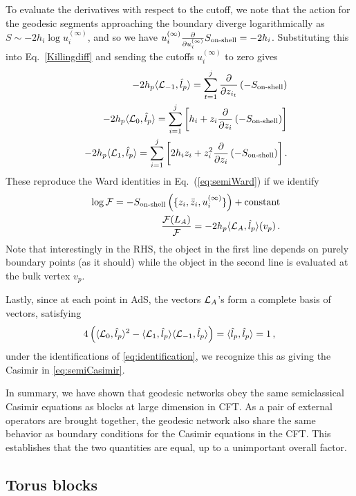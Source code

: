 \documentclass[12pt]{article}
\newcommand{\bea}{\begin{eqnarray}}
\newcommand{\eea}{\end{eqnarray}}
\begin{document}
To evaluate the derivatives with respect to the cutoff, we note that the action for the geodesic segments approaching the boundary diverge logarithmically as $S \sim -2h_i \log u_i^{(\infty)}$, and so we have $\scriptsize{u_{i}^{(\infty)}}\frac{\partial}{\partial u_{i}^{(\infty)}}S_{\text{on-shell}}= -2h_i$. Substituting this into Eq.~\ref{Killingdiff} and sending the cutoffs $u_{i}^{(\infty)}$ to zero gives
\bea
 &~&-2h_p\langle {\cal{L}}_{-1},\hat{l}_p\rangle=\sum_{t=1}^{j}\frac{\partial}{\partial z_{i_t}}\left(-S_{\text{on-shell}}\right) \notag \\
&~&-2h_p\langle{\cal{L}}_0,\hat{l}_p\rangle=\sum_{i=1}^{j}\left[
h_{i}
+z_{i}\frac{\partial}{\partial z_{i}}\left(-S_{\text{on-shell}}\right)\right] \notag \\
&~&
-2h_p \langle {\cal{L}}_1,\hat{l}_p\rangle=\sum_{i=1}^{j}
\left[
2h_{i}z_{i}
+
z_{i}^2\frac{\partial}{\partial z_{i}}\left(-S_{\text{on-shell}}\right)
\right].
\eea These reproduce the Ward identities in Eq.~(\ref{eq:semiWard}) if we identify
\bea \label{eq:identification}
&~& \log\mathcal{F}=-S_\text{on-shell}\left(\{z_i,\bar{z}_i,u_i^{(\infty)}\}\right)+{\text{constant}} \notag \\
&~&
\frac{\mathcal{F}(L_A)}{\mathcal{F}}=-2h_p\langle {\cal{L}}_A,\hat{l}_p\rangle(v_p)\,.
\eea Note that interestingly in the RHS, the object in the first line depends on purely  boundary points (as it should) while the object in the second line is evaluated at the bulk vertex $v_p$.

Lastly, since at each point in AdS, the  vectors ${\cal{L}}_A$'s  form a complete basis of  vectors, satisfying
\begin{equation}
4\left(\langle {\cal{L}}_0,\hat{l}_p\rangle^2-\langle{\mathcal{L}}_1,\hat{l}_p\rangle\langle{\mathcal{L}}_{-1},\hat{l}_p\rangle\right)=\langle \hat{l}_p,\hat{l}_p\rangle=1\,, \end{equation}
under the identifications of \cref{eq:identification}, we recognize this as giving the Casimir in \cref{eq:semiCasimir}.

In summary, we have shown that geodesic networks obey the same semiclassical Casimir equations as blocks at large dimension in CFT.
As a pair of external operators are brought together, the geodesic network also share the same behavior as boundary conditions for the Casimir equations in the CFT. This establishes that the two quantities are equal, up to a unimportant overall factor.


\subsection{Torus blocks}
\end{document}
